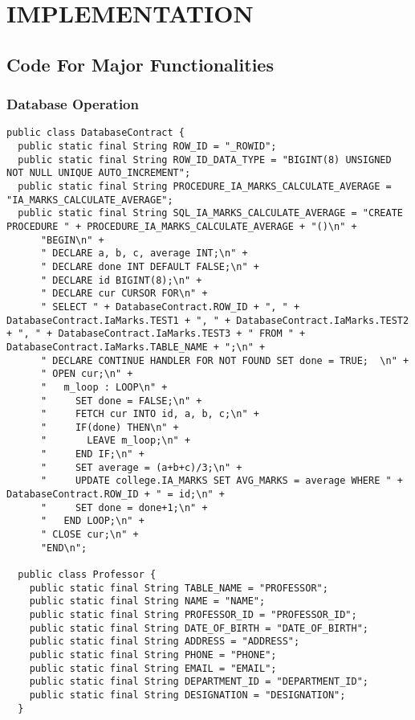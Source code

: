 \chapter{IMPLEMENTATION}
\section{Code For Major Functionalities}
\subsection{Database Operation}
\thispagestyle{fancy}

\begin{lstlisting}[caption=DatabaseContract.java]
public class DatabaseContract {
  public static final String ROW_ID = "_ROWID";
  public static final String ROW_ID_DATA_TYPE = "BIGINT(8) UNSIGNED NOT NULL UNIQUE AUTO_INCREMENT";
  public static final String PROCEDURE_IA_MARKS_CALCULATE_AVERAGE = "IA_MARKS_CALCULATE_AVERAGE";
  public static final String SQL_IA_MARKS_CALCULATE_AVERAGE = "CREATE PROCEDURE " + PROCEDURE_IA_MARKS_CALCULATE_AVERAGE + "()\n" +
      "BEGIN\n" +
      " DECLARE a, b, c, average INT;\n" +
      " DECLARE done INT DEFAULT FALSE;\n" +
      " DECLARE id BIGINT(8);\n" +
      " DECLARE cur CURSOR FOR\n" +
      " SELECT " + DatabaseContract.ROW_ID + ", " + DatabaseContract.IaMarks.TEST1 + ", " + DatabaseContract.IaMarks.TEST2 + ", " + DatabaseContract.IaMarks.TEST3 + " FROM " + DatabaseContract.IaMarks.TABLE_NAME + ";\n" +
      " DECLARE CONTINUE HANDLER FOR NOT FOUND SET done = TRUE;  \n" +
      " OPEN cur;\n" +
      "   m_loop : LOOP\n" +
      "     SET done = FALSE;\n" +
      "     FETCH cur INTO id, a, b, c;\n" +
      "     IF(done) THEN\n" +
      "       LEAVE m_loop;\n" +
      "     END IF;\n" +
      "     SET average = (a+b+c)/3;\n" +
      "     UPDATE college.IA_MARKS SET AVG_MARKS = average WHERE " + DatabaseContract.ROW_ID + " = id;\n" +
      "     SET done = done+1;\n" +
      "   END LOOP;\n" +
      " CLOSE cur;\n" +
      "END\n";

  public class Professor {
    public static final String TABLE_NAME = "PROFESSOR";
    public static final String NAME = "NAME";
    public static final String PROFESSOR_ID = "PROFESSOR_ID";
    public static final String DATE_OF_BIRTH = "DATE_OF_BIRTH";
    public static final String ADDRESS = "ADDRESS";
    public static final String PHONE = "PHONE";
    public static final String EMAIL = "EMAIL";
    public static final String DEPARTMENT_ID = "DEPARTMENT_ID";
    public static final String DESIGNATION = "DESIGNATION";
  }


\end{lstlisting}
